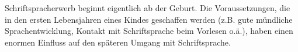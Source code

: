 Schriftspracherwerb beginnt eigentlich ab der Geburt.
Die Voraussetzungen, die in den ersten Lebensjahren eines Kindes geschaffen werden (z.B. gute mündliche Sprachentwicklung, Kontakt mit Schriftsprache beim Vorlesen o.ä.), haben einen enormen Einfluss auf den späteren Umgang mit Schriftsprache.